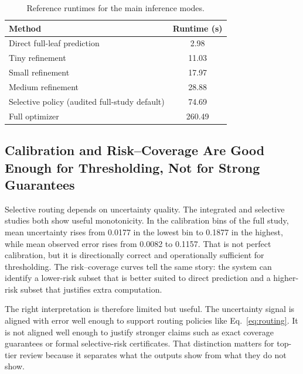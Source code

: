 \documentclass[11pt,a4paper]{article}
\begin{document}
\begin{table}[H]
\centering
\caption{Reference runtimes for the main inference modes.}
\label{tab:runtimesB}
\small
\begin{tabular}{lc}
\toprule
Method & Runtime (s) \\
\midrule
Direct full-leaf prediction & 2.98 \\
Tiny refinement & 11.03 \\
Small refinement & 17.97 \\
Medium refinement & 28.88 \\
Selective policy (audited full-study default) & 74.69 \\
Full optimizer & 260.49 \\
\bottomrule
\end{tabular}
\end{table}

\subsection{Calibration and Risk--Coverage Are Good Enough for Thresholding, Not for Strong Guarantees}
Selective routing depends on uncertainty quality.
The integrated and selective studies both show useful monotonicity.
In the calibration bins of the full study, mean uncertainty rises from 0.0177 in the lowest bin to 0.1877 in the highest, while mean observed error rises from 0.0082 to 0.1157.
That is not perfect calibration, but it is directionally correct and operationally sufficient for thresholding.
The risk--coverage curves tell the same story: the system can identify a lower-risk subset that is better suited to direct prediction and a higher-risk subset that justifies extra computation.

The right interpretation is therefore limited but useful.
The uncertainty signal is aligned with error well enough to support routing policies like Eq.~\eqref{eq:routing}.
It is not aligned well enough to justify stronger claims such as exact coverage guarantees or formal selective-risk certificates.
That distinction matters for top-tier review because it separates what the outputs show from what they do not show.
\end{document}
